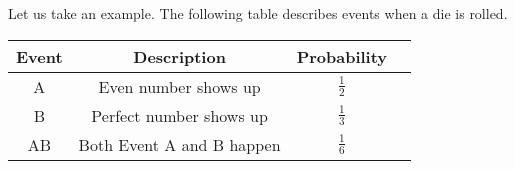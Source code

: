 \documentclass[journal,12pt,twocolumn]{IEEEtran}
\theoremstyle{remark}
\begin{document}
	Let us take an example. The following table describes events when a die is rolled.
	\begin{table}[htbp]
	    \centering
	    \begin{tabular}{|c|c|c|c|}
	        \hline
	        Event & Description & Probability \\
	        \hline
	        A & Even number shows up & $\frac{1}{2}$ \\
	        \hline
	        B & Perfect number shows up & $\frac{1}{3}$ \\
	        \hline
	        AB & Both Event A and B happen & $\frac{1}{6}$ \\ 
	        \hline
	    \end{tabular}
	\end{table}
\end{document}

